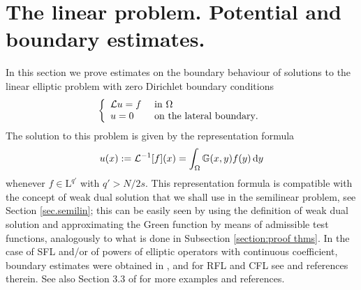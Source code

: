 \documentclass[11pt]{article}
\numberwithin{equation}{section}
\newcommand{\dy}{\,{\rm d}y}
\def\LL{\mathrm{L}} %
\newcommand{\A}{\mathcal{L}}
\newcommand{\AI}{\mathcal{L}^{-1}}
\newcommand{\K}{{\mathbb G}}
\begin{document}
\section{The linear problem. Potential and boundary estimates.}\label{sec.lin.f}
%
In this section we prove estimates on the boundary behaviour of solutions to the linear elliptic problem with zero Dirichlet boundary conditions
\begin{equation}\label{Elliptic.prob.linear.f}
\left\{\begin{array}{lll}
\A u= f &  ~ {\rm in}~  \Omega\\
u=0 & ~\mbox{on the lateral boundary}.
\end{array}
\right.
\end{equation}
The solution to this problem is given by the representation formula
\begin{equation}\label{repr.form.linear}
u(x):=\AI[f](x)=\int_\Omega \K(x,y)f(y)\dy
\end{equation}
whenever $f\in \LL^{q'}$ with $q'>N/2s$. This representation formula is compatible with the concept of weak dual solution that we shall use in the semilinear problem, see Section \ref{sec.semilin}; this can be easily seen by using the definition of weak dual solution and approximating the Green function by means of admissible test functions, analogously to what is done in Subsection \ref{section:proof thms}.
%
  In the case of SFL and/or of powers of elliptic operators with continuous coefficient, boundary estimates were obtained in \cite{CS2016,CDDS, SV2003}, and for RFL and CFL see \cite{Ka,RosOton1} and references therein. See also Section 3.3 of \cite{BV-PPR2-1} for more examples and references.
\end{document}
